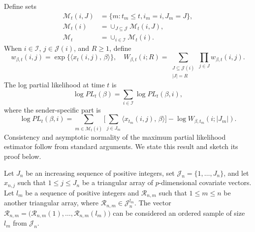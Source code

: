 \documentclass[aoas,preprint]{imsart}
\begin{document}
Define sets
\begin{align*}
    \mathcal{M}_t(i, J)
        &= \{ m : t_m \leq t, i_m = i, J_m = J \}, \\
    \mathcal{M}_t(i)
        &= \cup_{J \subseteq \mathcal{J}} \mathcal{M}_t(i, J), \\
    \mathcal{M}_t
        &= \cup_{i \in \mathcal{I}} \mathcal{M}_t(i).
\end{align*}
When $i \in \mathcal{I}$, $j \in \mathcal{J}(i)$, and $R \geq 1$, define
\[
    w_{\beta,t}(i,j) = \exp\{ \langle x_t(i,j), \, \beta \rangle \},
    \quad
    W_{\beta,t}(i; R)
    =
    \!\!
    \sum_{\substack{J \subseteq \mathcal{J}(i)\\ |J| = R}}
        \prod_{j \in J}
            w_{\beta,t}(i,j).
\]
The log partial likelihood at time $t$ is
\begin{equation}\label{E:log-pl-multiple}
    \log \mathit{PL}_t(\beta)
        =
        \sum_{i \in \mathcal{I}}
        \log \mathit{PL}_t(\beta, i),
\end{equation}
where the sender-specific part is
\begin{equation}\label{E:sender-log-pl-multiple}
    \log \mathit{PL}_t(\beta, i)
        =
        \sum_{m \in \mathcal{M}_t(i)}
        \Big[
            \sum_{j \in J_m}
                \langle x_{t_m}\!(i, j), \, \beta \rangle
        \Big]
            -
            \log W_{\beta,t_m} (i ; |J_m|).
\end{equation}
Consistency and asymptotic normality of the maximum partial likelihood
estimator follow from standard arguments.  We state this result and
sketch its proof below.

Let $J_n$ be an increasing sequence of positive integers, set
$\mathcal{J}_n = \{ 1, \ldots, J_n \}$, and
let $x_{n,j}$ such that $1 \leq j \leq J_n$ be a triangular array of
$p$-dimensional covariate vectors.  Let $l_m$ be a sequence of positive
integers and $\mathcal{R}_{n,m}$ such that
$1 \leq m \leq n$ be another triangular array, where
$\mathcal{R}_{n,m} \in \mathcal{J}_n^{l_m}$.  The vector
\(
    \mathcal{R}_{n,m}
    =
    \big(
        \mathcal{R}_{n,m}(1), \ldots, \mathcal{R}_{n,m}(l_m)
    \big)
\)
can be considered an ordered sample of size $l_m$ from $\mathcal{J}_n$.
\end{document}
